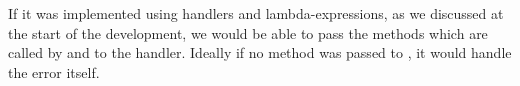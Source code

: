 If it was implemented using handlers and lambda-expressions, as we discussed at
the start of the development, we would be able to pass the methods which are
called by  and  to the handler. Ideally if no
method was passed to , it would handle the error itself.




% 













